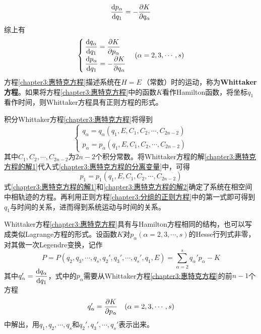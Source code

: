 \begin{equation*}
	\frac{\mathrm{d} p_\alpha}{\mathrm{d} q_1} = -\frac{\partial K}{\partial q_\alpha}
\end{equation*}
综上有
\begin{equation}
\begin{cases}
	\displaystyle \frac{\mathrm{d} q_\alpha}{\mathrm{d} q_1} = \frac{\partial K}{\partial p_\alpha} \\[1.5ex]
	\displaystyle \frac{\mathrm{d} p_\alpha}{\mathrm{d} q_1} = -\frac{\partial K}{\partial q_\alpha}
\end{cases}
(\alpha=2,3,\cdots,s)
\label{chapter3:惠特克方程}
\end{equation}
方程\eqref{chapter3:惠特克方程}描述系统在$H=E\,\text{（常数）}$时的运动，称为{\bf Whittaker方程}。如果将方程\eqref{chapter3:惠特克方程}中的函数$K$看作Hamilton函数，将坐标$q_1$看作时间，则Whittaker方程具有正则方程的形式。

积分Whittaker方程\eqref{chapter3:惠特克方程}将得到
\begin{equation}
\begin{cases}
	q_\alpha = q_\alpha(q_1,E,C_1,C_2,\cdots,C_{2n-2}) \\
	p_\alpha = p_\alpha(q_1,E,C_1,C_2,\cdots,C_{2n-2})
\end{cases}
\label{chapter3:惠特克方程的解1}
\end{equation}
其中$C_1,C_2,\cdots,C_{2n-2}$为$2n-2$个积分常数。将Whittaker方程的解\eqref{chapter3:惠特克方程的解1}代入式\eqref{chapter3:惠特克方程的分离变量}中，可得
\begin{equation}
	p_1 = p_1(q_1,E,C_1,C_2,\cdots,C_{2n-2})
	\label{chapter3:惠特克方程的解2}
\end{equation}
式\eqref{chapter3:惠特克方程的解1}和\eqref{chapter3:惠特克方程的解2}确定了系统在相空间中相轨迹的方程。再利用正则方程\eqref{chapter3:分组的正则方程}中的第一式即可得到$q_1$与时间的关系，进而得到系统运动与时间的关系。

Whittaker方程\eqref{chapter3:惠特克方程}具有与Hamilton方程相同的结构，也可以写成类似Lagrange方程的形式。设函数$K$对$p_\alpha(\alpha=2,3,\cdots,s)$的Hesse行列式非零，对其做一次Legendre变换，记作
\begin{equation}
	P = P(q_2,q_3,\cdots,q_s,q_2',q_3',\cdots,q_s',q_1,E) = \sum_{\alpha=2}^s q_\alpha'p_\alpha-K
\end{equation}
其中$q_\alpha' = \dfrac{\mathrm{d} q_\alpha}{\mathrm{d} q_1}$，式中的$p_\alpha$需要从Whittaker方程\eqref{chapter3:惠特克方程}的前$n-1$个方程
\begin{equation*}
	q_\alpha' = \frac{\partial K}{\partial p_\alpha}\quad (\alpha=2,3,\cdots,s)
\end{equation*}
中解出，用$q_1,q_2,\cdots,q_s$和$q_2',q_3',\cdots,q_s'$表示出来。

